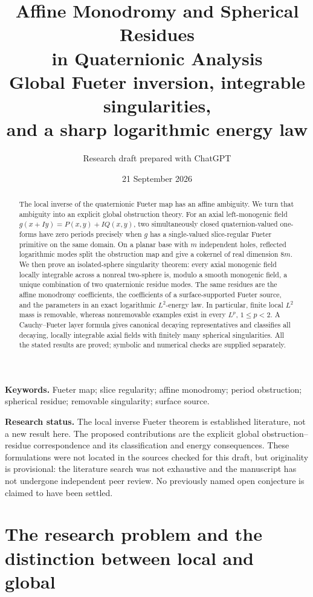 \documentclass[11pt,a4paper]{article}
\title{\vspace{-10mm}\textbf{Affine Monodromy and Spherical Residues\\in Quaternionic Analysis}\\[5pt]
\large Global Fueter inversion, integrable singularities,\\and a sharp logarithmic energy law}
\author{Research draft prepared with ChatGPT}
\date{21 September 2026}
\numberwithin{equation}{section}
\theoremstyle{definition}
\theoremstyle{remark}
\begin{document}
\maketitle
\thispagestyle{empty}
\begin{abstract}
The local inverse of the quaternionic Fueter map has an affine ambiguity.
We turn that ambiguity into an explicit global obstruction theory. For an
axial left-monogenic field $g(x+Iy)=P(x,y)+IQ(x,y)$, two simultaneously
closed quaternion-valued one-forms have zero periods precisely when $g$
has a single-valued slice-regular Fueter primitive on the same domain.
On a planar base with $m$ independent holes, reflected logarithmic modes
split the obstruction map and give a cokernel of real dimension $8m$.
We then prove an isolated-sphere singularity theorem: every axial monogenic
field locally integrable across a nonreal two-sphere is, modulo a smooth
monogenic field, a unique combination of two quaternionic residue modes.
The same residues are the affine monodromy coefficients, the coefficients
of a surface-supported Fueter source, and the parameters in an exact
logarithmic $L^2$-energy law. In particular, finite local $L^2$ mass is
removable, whereas nonremovable examples exist in every $L^p$, $1\le p<2$.
A Cauchy--Fueter layer formula gives canonical decaying representatives and
classifies all decaying, locally integrable axial fields with finitely many
spherical singularities. All the stated results are proved; symbolic and
numerical checks are supplied separately.
\end{abstract}
\noindent\textbf{Keywords.} Fueter map; slice regularity; affine monodromy;
period obstruction; spherical residue; removable singularity; surface source.

\medskip
\noindent\textbf{Research status.} The local inverse Fueter theorem is established
literature, not a new result here. The proposed contributions are the explicit
global obstruction--residue correspondence and its classification and energy
consequences. These formulations were not located in the sources checked for
this draft, but originality is provisional: the literature search was not
exhaustive and the manuscript has not undergone independent peer review.
No previously named open conjecture is claimed to have been settled.
\newpage
\begingroup
\small
\setlength{\parskip}{0pt}
\tableofcontents
\endgroup
\newpage

\section{The research problem and the distinction between local and global}
\label{sec:intro}
\end{document}
